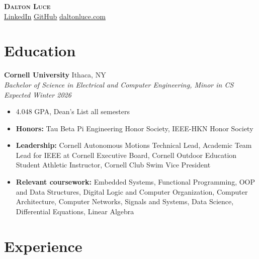 \documentclass[letterpaper,10pt]{article}
\newcommand{\resumeEntry}[4]{
    \vspace{5pt}
    {\large \textbf{#1}}
    \hfill
    {\normalsize #2}
    \\
    \textit{#3} \hfill \textit{#4}
    \vspace{1pt}
}
\newcommand{\itemsBegin}{
    \begin{itemize}[leftmargin=0.2in, labelsep=0.05in, itemsep=0pt, parsep=1pt, topsep=0pt, partopsep=0pt]
    \small
}
\newcommand{\itemsEnd}{\end{itemize}}
\begin{document}
\textbf{\huge \scshape Dalton Luce} \\
\vspace{2pt}
\small
\addressConditional{}   %
\phoneConditional{}     %
\emailConditional{}     %
\href{https://www.linkedin.com/in/dalton-luce/}{\underline{LinkedIn}} %
\hspace{10pt}
\href{https://github.com/da-luce}{\underline{GitHub}}                 %
\hspace{10pt}
\href{https://daltonluce.com/}{\underline{daltonluce.com}}            %
\vspace{-5pt}

\section{Education}

    \resumeEntry{Cornell University}
        {Ithaca, NY}
        {Bachelor of Science in Electrical and Computer Engineering, Minor in CS}
        {Expected Winter 2026}

    \itemsBegin{}
        \item 4.048 GPA, Dean's List all semesters
        \item \textbf{Honors:} Tau Beta Pi Engineering Honor Society, IEEE-HKN Honor Society
        \item \textbf{Leadership:} Cornell Autonomous Motions Technical Lead, Academic Team Lead for IEEE at Cornell Executive Board, Cornell Outdoor Education Student Athletic Instructor, Cornell Club Swim Vice President
        \item \textbf{Relevant coursework:} Embedded Systems, Functional Programming, OOP and Data Structures, Digital Logic and Computer Organization, Computer Architecture, Computer Networks, Signals and Systems, Data Science, Differential Equations, Linear Algebra
    \itemsEnd{}

\section{Experience}
\end{document}
